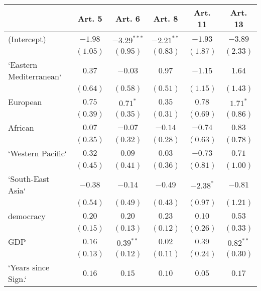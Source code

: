 
\begin{table}[!h]
\begin{center}
\begin{tabular}{l c c c c c }
\toprule
 & Art. 5 & Art. 6 & Art. 8 & Art. 11 & Art. 13 \\
\midrule
(Intercept)             & $-1.98$      & $-3.29^{***}$ & $-2.21^{**}$ & $-1.93$      & $-3.89$      \\
                        & $(1.05)$     & $(0.95)$      & $(0.83)$     & $(1.87)$     & $(2.33)$     \\
`Eastern Mediterranean` & $0.37$       & $-0.03$       & $0.97$       & $-1.15$      & $1.64$       \\
                        & $(0.64)$     & $(0.58)$      & $(0.51)$     & $(1.15)$     & $(1.43)$     \\
European                & $0.75$       & $0.71^{*}$    & $0.35$       & $0.78$       & $1.71^{*}$   \\
                        & $(0.39)$     & $(0.35)$      & $(0.31)$     & $(0.69)$     & $(0.86)$     \\
African                 & $0.07$       & $-0.07$       & $-0.14$      & $-0.74$      & $0.83$       \\
                        & $(0.35)$     & $(0.32)$      & $(0.28)$     & $(0.63)$     & $(0.78)$     \\
`Western Pacific`       & $0.32$       & $0.09$        & $0.03$       & $-0.73$      & $0.71$       \\
                        & $(0.45)$     & $(0.41)$      & $(0.36)$     & $(0.81)$     & $(1.00)$     \\
`South-East Asia`       & $-0.38$      & $-0.14$       & $-0.49$      & $-2.38^{*}$  & $-0.81$      \\
                        & $(0.54)$     & $(0.49)$      & $(0.43)$     & $(0.97)$     & $(1.21)$     \\
democracy               & $0.20$       & $0.20$        & $0.23$       & $0.10$       & $0.53$       \\
                        & $(0.15)$     & $(0.13)$      & $(0.12)$     & $(0.26)$     & $(0.33)$     \\
GDP                     & $0.16$       & $0.39^{**}$   & $0.02$       & $0.39$       & $0.82^{**}$  \\
                        & $(0.13)$     & $(0.12)$      & $(0.11)$     & $(0.24)$     & $(0.30)$     \\
`Years since Sign.`     & $0.16$       & $0.15$        & $0.10$       & $0.05$       & $0.17$       \\

\end{tabular}
\end{center}
\end{table}
